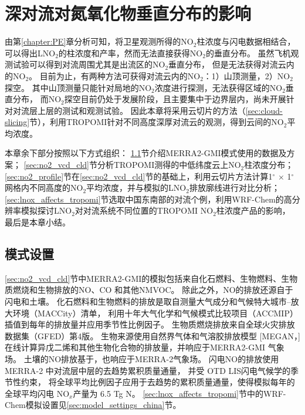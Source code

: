 
\chapter{深对流对氮氧化物垂直分布的影响} \label{sec:effects_on_nox_profile}

由第\ref{chapter:PE}章分析可知，将卫星观测所得的NO$_2$柱浓度与闪电数据相结合，
可以得出LNO$_2$的柱浓度和产率，然而无法直接获得NO$_2$的垂直分布。
虽然飞机观测试验可以得到对流周围尤其是出流区的NO$_2$垂直分布\citep{Barth.2019}，
但是无法获得对流云内的NO$_2$。
目前为止，有两种方法可获得对流云内的NO$_2$：1）山顶测量，2）NO$_2$探空。
其中山顶测量只能针对局地的NO$_2$浓度进行探测，无法获得区域的NO$_2$垂直分布\citep{Reiter.1970,Wang.2021a}，
而NO$_2$探空目前仍处于发展阶段，且主要集中于边界层内\citep{Sluis.2010}，尚未开展针对对流层上层的测试和观测试验。
因此本章将采用云切片的方法（\ref{sec:cloud-slicing}节），利用TROPOMI针对不同高度深厚对流云的观测，得到云间的NO$_2$平均浓度。

本章余下部分按照以下方式组织：
\ref{sec:model_settings_gmi}节介绍MERRA2-GMI模式使用的数据及方案；
\ref{sec:no2_vcd_cld}节分析TROPOMI测得的中低纬度云上NO$_2$柱浓度分布；
\ref{sec:no2_profile}节在\ref{sec:no2_vcd_cld}节的基础上，利用云切片方法计算1$^{\circ}$ $\times$ 1$^{\circ}$ 网格内不同高度的NO$_2$平均浓度，并与模拟的LNO$_2$排放廓线进行对比分析；
\ref{sec:lnox_affects_tropomi}节选取中国东南部的对流个例，利用WRF-Chem的高分辨率模拟探讨LNO$_2$对对流系统不同位置的TROPOMI NO$_2$柱浓度产品的影响，
最后是本章小结。



\section{模式设置} \label{sec:model_settings_gmi}

\ref{sec:no2_vcd_cld}节中MERRA2-GMI的模拟包括来自化石燃料、生物燃料、生物质燃烧和生物排放的NO、CO 和其他NMVOC。
除此之外，NO的排放还源自于闪电和土壤。
化石燃料和生物燃料的排放是取自测量大气成分和气候特大城市--放大环境（MACCity）清单\citep{Granier.2011}，
利用十年大气化学和气候模式比较项目（ACCMIP）插值到每年的排放量并应用季节性比例因子\citep{Lamarque.2010}。
生物质燃烧排放来自全球火灾排放数据集（GFED）第4版\citep{Giglio.2013}。
生物来源使用自然界气体和气溶胶排放模型 [MEGAN，\citet{Guenther.1999}]
在线计算异戊二烯和其他生物化合物的排放量，并响应于MERRA2-GMI 气象场。
土壤的NO排放基于\citet{Yienger.1995}，也响应于MERRA-2气象场。
闪电NO的排放使用 MERRA-2 中对流层中层的去趋势累积质量通量\citep{Allen.2010}，
并受 OTD LIS闪电气候学的季节性约束\citep{Cecil.2014}，
将全球平均比例因子应用于去趋势的累积质量通量，使得模拟每年的全球平均闪电 NO$_x$产量为 6.5 Tg N。
\ref{sec:lnox_affects_tropomi}节中的WRF-Chem模拟设置见\ref{sec:model_settings_china}节。

